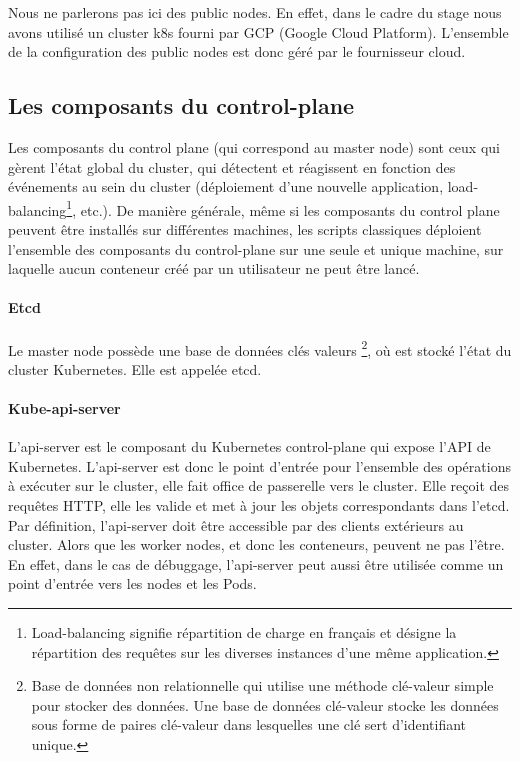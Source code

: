 \documentclass[11pt,fleqn]{book} %
\begin{document}
Nous ne parlerons pas ici des public nodes. En effet, dans le cadre du stage nous avons utilisé un cluster k8s fourni par GCP (Google Cloud Platform). L'ensemble de la configuration des public nodes est donc géré par le fournisseur cloud.


\subsection*{Les composants du control-plane}
Les composants du control plane (qui correspond au master node) sont ceux qui gèrent l'état global du cluster, qui détectent et réagissent en fonction des événements au sein du cluster (déploiement d'une nouvelle application, load-balancing\footnote{Load-balancing signifie répartition de charge en français et désigne la répartition des requêtes sur les diverses instances d'une même application.}, etc.). De manière générale, même si les composants du control plane peuvent être installés sur différentes machines, les scripts classiques déploient l'ensemble des composants du control-plane sur une seule et unique machine, sur laquelle aucun conteneur créé par un utilisateur ne peut être lancé.

\paragraph*{Etcd}
Le master node possède une base de données clés valeurs \footnote{Base de données non relationnelle qui utilise une méthode clé-valeur simple pour stocker des données. Une base de données clé-valeur stocke les données sous forme de paires clé-valeur dans lesquelles une clé sert d'identifiant unique.}, où est stocké l'état du cluster Kubernetes. Elle est appelée etcd.

\paragraph*{Kube-api-server}
L'api-server est le composant du Kubernetes control-plane qui expose l'API de Kubernetes. L'api-server est donc le point d'entrée pour l'ensemble des opérations à exécuter sur le cluster, elle fait office de passerelle vers le cluster. Elle reçoit des requêtes HTTP, elle les valide et met à jour les objets correspondants dans l'etcd. Par définition, l'api-server doit être accessible par des clients extérieurs au cluster. Alors que les worker nodes, et donc les conteneurs, peuvent ne pas l'être. En effet, dans le cas de débuggage, l'api-server peut aussi être utilisée comme un point d'entrée vers les nodes et les Pods.
\end{document}
